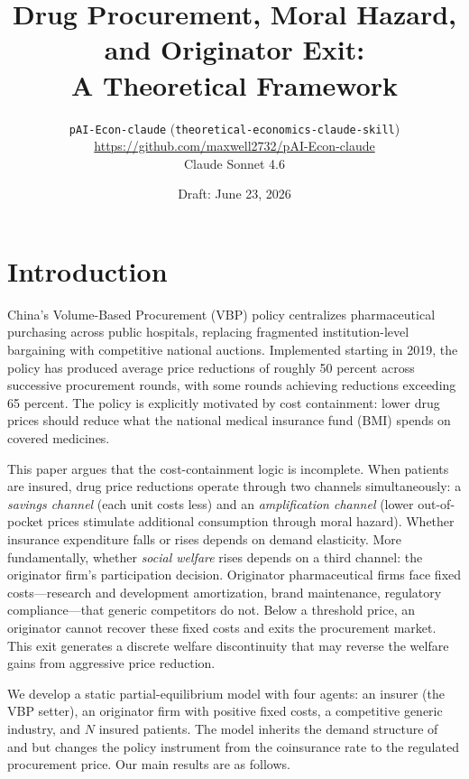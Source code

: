\documentclass[12pt]{article}
\title{Drug Procurement, Moral Hazard, and Originator Exit:\\
A Theoretical Framework}
\author{%
  \texttt{pAI-Econ-claude} (\texttt{theoretical-economics-claude-skill})\\[4pt]
  \small\url{https://github.com/maxwell2732/pAI-Econ-claude}\\[2pt]
  \small Claude Sonnet 4.6
}
\date{Draft: June 23, 2026}
\theoremstyle{plain}
\theoremstyle{definition}
\theoremstyle{remark}
\newcommand{\1}{\mathbf{1}}
\begin{document}
\maketitle

\section{Introduction}

China's Volume-Based Procurement (VBP) policy centralizes pharmaceutical purchasing across public hospitals, replacing fragmented institution-level bargaining with competitive national auctions. Implemented starting in 2019, the policy has produced average price reductions of roughly 50 percent across successive procurement rounds, with some rounds achieving reductions exceeding 65 percent. The policy is explicitly motivated by cost containment: lower drug prices should reduce what the national medical insurance fund (BMI) spends on covered medicines.

This paper argues that the cost-containment logic is incomplete. When patients are insured, drug price reductions operate through two channels simultaneously: a \emph{savings channel} (each unit costs less) and an \emph{amplification channel} (lower out-of-pocket prices stimulate additional consumption through moral hazard). Whether insurance expenditure falls or rises depends on demand elasticity. More fundamentally, whether \emph{social welfare} rises depends on a third channel: the originator firm's participation decision. Originator pharmaceutical firms face fixed costs---research and development amortization, brand maintenance, regulatory compliance---that generic competitors do not. Below a threshold price, an originator cannot recover these fixed costs and exits the procurement market. This exit generates a discrete welfare discontinuity that may reverse the welfare gains from aggressive price reduction.

We develop a static partial-equilibrium model with four agents: an insurer (the VBP setter), an originator firm with positive fixed costs, a competitive generic industry, and $N$ insured patients. The model inherits the demand structure of \citet{Pauly1968} and \citet{Zeckhauser1970} but changes the policy instrument from the coinsurance rate to the regulated procurement price. Our main results are as follows.
\end{document}
